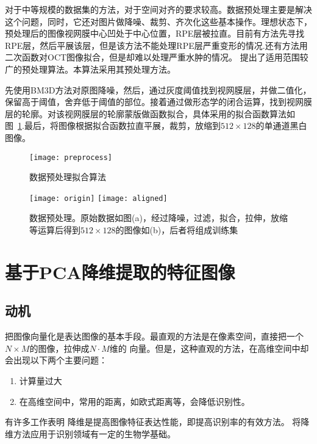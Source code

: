     对于中等规模的数据集的方法，对于空间对齐的要求较高。数据预处理主要是解决这个问题，同时，它还对图片做降噪、裁剪、齐次化这些基本操作。理想状态下，预处理后的图像视网膜中心凹处于中心位置，RPE层被拉直。目前有方法\cite{srinivasan2014fully}先寻找RPE层，然后平展该层，但是该方法不能处理RPE层严重变形的情况\cite{sun2017fully}.还有方法\cite{liu2011automated}用二次函数对OCT图像拟合，但是却难以处理严重水肿的情况。 提出了适用范围较广的预处理算法。本算法采用其预处理方法。

    先使用BM3D方法对原图降噪\cite{dabov2007image}，然后，通过灰度阈值找到视网膜层，并做二值化，保留高于阈值，舍弃低于阈值的部位。接着通过做形态学的闭合运算，找到视网膜层的轮廓。对该视网膜层的轮廓蒙版做函数拟合，具体采用的拟合函数算法如图~\ref{fig:preprocess}.最后，将图像根据拟合函数拉直平展，裁剪，放缩到$512\times 128$的单通道黑白图像。
    \begin{figure}[h] %
      \centering
      \texttt{[image: preprocess]}
      \caption{数据预处理拟合算法}
      \label{fig:preprocess}
    \end{figure}

    \begin{figure}[h]
      \centering%
      \subcaptionbox{\label{fig:origin}} %
        {\texttt{[image: origin]}} %
      \subcaptionbox{\label{fig:aligned}} %
        {\texttt{[image: aligned]}} \\
      \caption[数据预处理]{数据预处理。原始数据如图(a)，经过降噪，过滤，拟合，拉伸，放缩等运算后得到$512\times 128$的图像如(b)，后者将组成训练集} 
      \label{fig:origin-pre}
    \end{figure}


\section{基于PCA降维提取的特征图像}
\label{sec:pcaDR}
    \subsection{动机}
    把图像向量化是表达图像的基本手段。最直观的方法是在像素空间，直接把一个$N \times M$的图像，拉伸成$N\cdot M$维的 向量。但是，这种直观的方法，在高维空间中却会出现以下两个主要问题：
    \begin{enumerate}
        \item 计算量过大
        \item 在高维空间中，常用的距离，如欧式距离等，会降低识别性。
    \end{enumerate}
    有许多工作表明%
    降维是提高图像特征表达性能，即提高识别率的有效方法。
    将降维方法应用于识别领域有一定的生物学基础。

